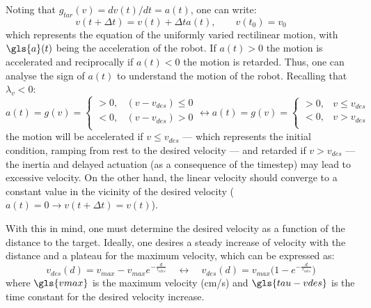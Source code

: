 Noting that $g_{tar}(v) = d v(t)/dt = a(t)$, one can write:
\begin{equation}
  \label{eq:15}
v(t + \Delta t) = v(t) + \Delta t a(t), \qquad v(t_0) = v_0
\end{equation}
which represents the equation of the uniformly varied rectilinear motion, with
$\gls{a}(t)$ being the acceleration of the robot. If $a(t) > 0$ the motion is
accelerated and reciprocally if $a(t) < 0$ the motion is retarded. Thus, one can
analyse the sign of $a(t)$ to understand the motion of the robot. Recalling that
$\lambda_v < 0$:
%
\begin{equation}
  \label{eq:16}
a(t) = g(v) = \left\{
\begin{array}{ll}
      > 0 , & (v - v_{des}) \leq 0 \\
      < 0 , & (v - v_{des}) > 0 \\
\end{array} 
\right. \leftrightarrow a(t) = g(v) = \left\{
\begin{array}{ll}
      > 0 , & v \leq v_{des} \\
      < 0 , & v > v_{des} \\
\end{array} 
\right. 
\end{equation}
%
the motion will be accelerated if $v \leq v_{des}$ --- which represents the
initial condition, ramping from rest to the desired velocity --- and retarded if
$v > v_{des}$ --- the inertia and delayed actuation (as a consequence of the
timestep) may lead to excessive velocity. On the other hand, the linear velocity
should converge to a constant value in the vicinity of the desired velocity
($a(t) = 0 \rightarrow v(t + \Delta t) = v(t)$).

With this in mind, one must determine the desired velocity as a function of the
distance to the target. Ideally, one desires a steady increase of velocity with
the distance and a plateau for the maximum velocity, which can be expressed as:
%
\begin{equation}
  \label{eq:14}
  v_{des} (d) = v_{max} - v_{max} e^{- \frac{d}{\tau_{vdes}}} \quad
  \leftrightarrow \quad
  v_{des} (d) = v_{max} \Big (1 - e^{- \frac{d}{\tau_{vdes}}} \Big )
\end{equation}
where $\gls{vmax}$ is the maximum velocity (cm/s) and $\gls{tau-vdes}$ is the time
constant for the desired velocity increase.

